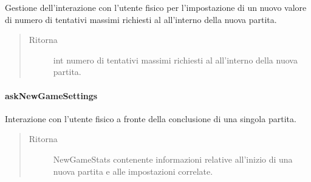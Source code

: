 \documentclass[letterpaper,10pt,italian]{sphinxmanual}
\begin{document}
\begin{fulllineitems}
\label{\detokenize{source/it/unicam/cs/pa/mastermind/ui/StartView:it.unicam.cs.pa.mastermind.ui.StartView.askNewAttempts()}}
Gestione dell’interazione con l’utente fisico per l’impostazione di un nuovo valore di numero di tentativi massimi richiesti al  all’interno della nuova partita.
\begin{quote}\begin{description}
\item[{Ritorna}] \leavevmode
int numero di tentativi massimi richiesti al  all’interno della nuova partita.

\end{description}\end{quote}

\end{fulllineitems}



\paragraph{askNewGameSettings}
\label{\detokenize{source/it/unicam/cs/pa/mastermind/ui/StartView:asknewgamesettings}}

\begin{fulllineitems}
\label{\detokenize{source/it/unicam/cs/pa/mastermind/ui/StartView:it.unicam.cs.pa.mastermind.ui.StartView.askNewGameSettings()}}
Interazione con l’utente fisico a fronte della conclusione di una singola partita.
\begin{quote}\begin{description}
\item[{Ritorna}] \leavevmode
NewGameStats contenente informazioni relative all’inizio di una nuova partita e alle impostazioni correlate.

\end{description}\end{quote}

\end{fulllineitems}
\end{document}
